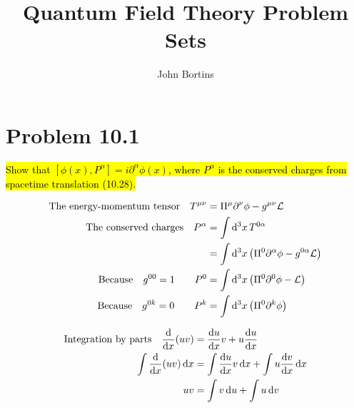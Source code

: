 \documentclass{article}
\title{Quantum Field Theory Problem Sets}
\author{John Bortins}
\begin{document}
\maketitle{}

\section*{Problem 10.1}
\begin{quoting}
    \hl{Show that $[\phi(x),P^\alpha]=i\partial^\alpha \phi(x)$, where $P^\alpha$ is the conserved charges from spacetime translation (10.28).}
\end{quoting}

\begin{align*}
    \qq*{The energy-momentum tensor}T^{\mu\nu} & =\Pi^\mu\partial^\nu \phi-g^{\mu\nu}\mathcal{L}                       \\
    \qq*{The conserved charges}P^\alpha        & =\int\dd[3]{x}T^{0\alpha}                                             \\
                                               & =\int\dd[3]{x}\pqty{\Pi^0\partial^\alpha \phi-g^{0\alpha}\mathcal{L}} \\
    \qq*{Because}g^{00}=1\qquad P^0            & =\int\dd[3]{x}\pqty{\Pi^0\partial^0 \phi-\mathcal{L}}                 \\
    \qq*{Because}g^{0k}=0\qquad P^k            & =\int\dd[3]{x}\pqty{\Pi^0\partial^k \phi}                             \\
\end{align*}

\begin{align*}
    \qq*{Integration by parts} \dv{x}(uv) & =\dv{u}{x}v+u\dv{u}{x}                        \\
    \int \dv{x}(uv) \dd{x}                & = \int \dv{u}{x}v\dd{x}+\int u\dv{v}{x}\dd{x} \\    
    uv                                    & =\int v\dd{u}+\int u\dd{v}                    \\           
\end{align*}
\end{document}

